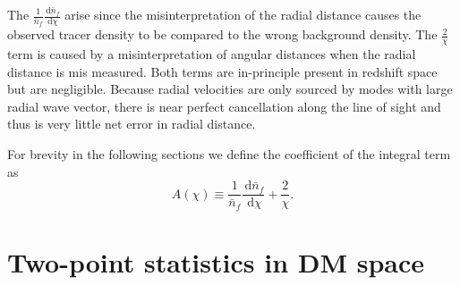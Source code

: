 \documentclass[twocolumn,prl,nofootinbib]{revtex4-1}
\newcommand{\ud}{\,\mathrm{d}}
\begin{document}
The $\frac{1}{\bar{n}_f}\frac{\ud \bar{n}_f}{\ud \chi}$ arise since the
misinterpretation of the radial distance causes the observed tracer density to
be compared to the wrong background density. The $\frac{2}{\chi}$ term is
caused by a misinterpretation of angular distances when the radial distance is
mis measured.  Both terms are in-principle present in redshift space but are
negligible. Because radial velocities are only sourced by modes with large
radial wave vector, there is near perfect cancellation along the line of sight
and thus is very little net error in radial distance.

For brevity in the following sections we define the coefficient of the integral
term as
\begin{equation}
    A(\chi) \equiv \frac{1}{\bar{n}_f}\frac{\ud \bar{n}_f}{\ud \chi}
    + \frac{2}{\chi}.
\end{equation}

\section{Two-point statistics in DM space}
\end{document}
